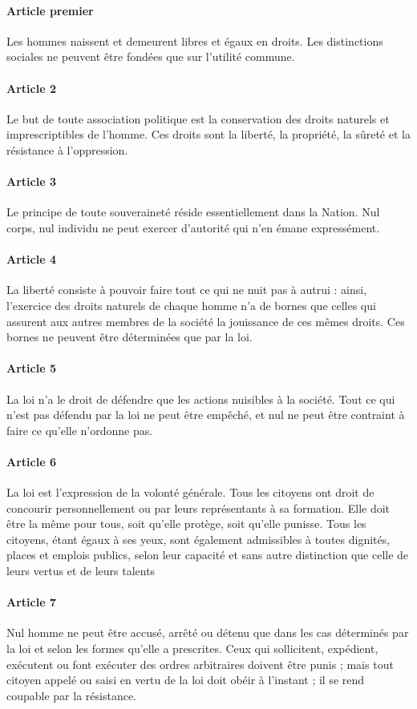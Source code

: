 \documentclass[a4paper,10pt]{book}
\begin{document}
\paragraph{Article premier}
Les hommes naissent et demeurent libres et égaux en droits. Les distinctions sociales
ne peuvent être fondées que sur l'utilité commune.
\paragraph{Article 2}
Le but de toute association politique est la conservation des droits naturels et 
imprescriptibles de l'homme. Ces droits sont la liberté, la propriété, la sûreté et la résistance à l'oppression.
\paragraph{Article 3}
Le principe de toute souveraineté réside essentiellement dans la Nation. Nul corps, nul individu ne peut exercer d'autorité qui n'en émane expressément.
\paragraph{Article 4}
La liberté consiste à pouvoir faire tout ce qui ne nuit pas à autrui : ainsi, 
l'exercice des droits naturels de chaque homme n'a de bornes que celles qui assurent aux autres membres de la société la jouissance de ces mêmes droits. 
Ces bornes ne peuvent être déterminées que par la loi.
\paragraph{Article 5}
La loi n'a le droit de défendre que les actions nuisibles à la société. Tout ce 
qui n'est pas défendu par la loi ne peut être empêché, et nul ne peut être 
contraint à faire ce qu'elle n'ordonne pas.
\paragraph{Article 6}
La loi est l'expression de la volonté générale. Tous les citoyens ont droit de 
concourir personnellement ou par leurs représentants à sa formation. Elle doit être 
la même pour tous, soit qu'elle protège, soit qu'elle punisse. Tous les citoyens, 
étant égaux à ses yeux, sont également admissibles à toutes dignités, places et 
emplois publics, selon leur capacité et sans autre distinction que celle de leurs 
vertus et de leurs talents
\paragraph{Article 7}
Nul homme ne peut être accusé, arrêté ou détenu que dans les cas déterminés par 
la loi et selon les formes qu'elle a prescrites. Ceux qui sollicitent, expédient, 
exécutent ou font exécuter des ordres arbitraires doivent être punis ; 
mais tout citoyen appelé ou saisi en vertu de la loi doit obéir à l'instant ; 
il se rend coupable par la résistance.
\end{document}
